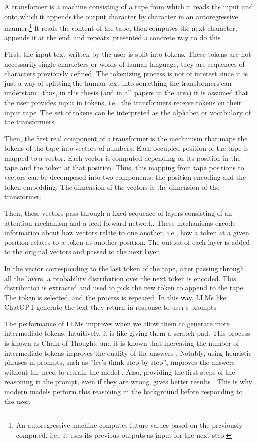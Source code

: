 A transformer is a machine consisting of a tape from which it reads the input and onto which it appends the output character by character in an autoregressive manner.\footnote{An autoregressive machine computes future values based on the previously computed, i.e., it uses its previous outputs as input for the next step.}
It reads the content of the tape, then computes the next character, appends it at the end, and repeats.
\citet{ATTN-all-you-need} presented a concrete way to do this.

First, the input text written by the user is split into tokens.
These tokens are not necessarily single characters or words of human language, they are sequences of characters previously defined.
The tokenizing process is not of interest since it is just a way of splitting the human text into something the transformers can understand; thus, in this thesis (and in all papers in the area) it is assumed that the user provides input in tokens, i.e., the transformers receive tokens on their input tape.
The set of tokens can be interpreted as the alphabet or vocabulary of the transformers.

Then, the first real component of a transformer is the mechanism that maps the tokens of the tape into vectors of numbers.
Each occupied position of the tape is mapped to a vector.
Each vector is computed depending on its position in the tape and the token at that position.
Thus, this mapping from tape positions to vectors can be decomposed into two components: the position encoding and the token embedding.
The dimension of the vectors is the dimension of the transformer.

Then, these vectors pass through a fixed sequence of layers consisting of an attention mechanism and a feed-forward network.
These mechanisms encode information about how vectors relate to one another, i.e., how a token at a given position relates to a token at another position.
The output of each layer is added to the original vectors and passed to the next layer.

In the vector corresponding to the last token of the tape, after passing through all the layers, a probability distribution over the next token is encoded.
This distribution is extracted and used to pick the new token to append to the tape.
The token is selected, and the process is repeated.
In this way, LLMs like ChatGPT generate the text they return in response to user's prompts

\medskip

The performance of LLMs improves when we allow them to generate more intermediate tokens.
Intuitively, it is like giving them a scratch pad.
This process is known as Chain of Thought, and it is known that increasing the number of intermediate tokens improves the quality of the answers \citep{wei2022chain}.
Notably, using heuristic phrases in prompts, such as ``let's think step by step'', improves the answers without the need to retrain the model \citep{kojima2022large}.
Also, providing the first steps of the reasoning in the prompt, even if they are wrong, gives better results \citep{wang-etal-2023-towards,cot-prompt}.
This is why modern models perform this reasoning in the background before responding to the user.

